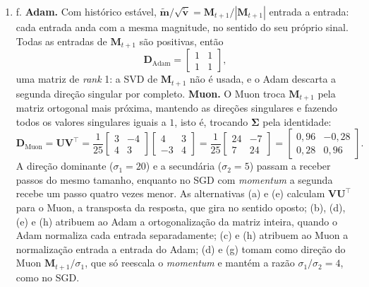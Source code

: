 \documentclass{dlproblemset}
\begin{document}
\begin{enumerate}[1)]
    \item f. \textbf{Adam.} Com histórico estável, $\widetilde{\mathbf{m}}/\sqrt{\widetilde{\mathbf{v}}} = \mathbf{M}_{t+1}/|\mathbf{M}_{t+1}|$ entrada a entrada: cada entrada anda com a mesma magnitude, no sentido do seu próprio sinal. Todas as entradas de $\mathbf{M}_{t+1}$ são positivas, então
    \[
    \mathbf{D}_{\text{Adam}} = \begin{bmatrix} 1 & 1 \\ 1 & 1 \end{bmatrix},
    \]
    uma matriz de \textit{rank} 1: a SVD de $\mathbf{M}_{t+1}$ não é usada, e o Adam descarta a segunda direção singular por completo. \textbf{Muon.} O Muon troca $\mathbf{M}_{t+1}$ pela matriz ortogonal mais próxima, mantendo as direções singulares e fazendo todos os valores singulares iguais a $1$, isto é, trocando $\boldsymbol{\Sigma}$ pela identidade:
    \[
    \mathbf{D}_{\text{Muon}} = \mathbf{U}\mathbf{V}^{\top}
    = \frac{1}{25}\begin{bmatrix} 3 & -4 \\ 4 & 3 \end{bmatrix}\begin{bmatrix} 4 & 3 \\ -3 & 4 \end{bmatrix}
    = \frac{1}{25}\begin{bmatrix} 24 & -7 \\ 7 & 24 \end{bmatrix}
    = \begin{bmatrix} 0{,}96 & -0{,}28 \\ 0{,}28 & 0{,}96 \end{bmatrix}.
    \]
    A direção dominante ($\sigma_1 = 20$) e a secundária ($\sigma_2 = 5$) passam a receber passos do mesmo tamanho, enquanto no SGD com \textit{momentum} a segunda recebe um passo quatro vezes menor. As alternativas (a) e (e) calculam $\mathbf{V}\mathbf{U}^{\top}$ para o Muon, a transposta da resposta, que gira no sentido oposto; (b), (d), (e) e (h) atribuem ao Adam a ortogonalização da matriz inteira, quando o Adam normaliza cada entrada separadamente; (c) e (h) atribuem ao Muon a normalização entrada a entrada do Adam; (d) e (g) tomam como direção do Muon $\mathbf{M}_{t+1}/\sigma_1$, que só reescala o \textit{momentum} e mantém a razão $\sigma_1/\sigma_2 = 4$, como no SGD.
\end{enumerate}
\end{document}
